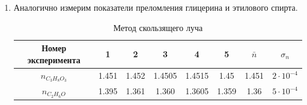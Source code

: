 \documentclass[12pt]{article}
\begin{document}
\begin{enumerate}
    \item Аналогично измерим показатели преломления глицерина и этилового спирта.
    
    \begin{table}[h!]
        \centering
        \begin{tabular}{| c | c | c | c | c | c | c | c |} 
            \hline
            Номер эксперимента & 1 & 2 & 3 & 4 & 5 & $\bar{n}$ & $\sigma_n$ \\
            \hline
            $n_{C_3 H_8 O_3}$ & 1.451 & 1.452 & 1.4505 & 1.4515 & 1.45 & 1.451 & $2 \cdot 10^{-4}$ \\ 
            \hline
            $n_{C_2 H_6 O}$ & 1.395 & 1.361 & 1.360 & 1.3605 & 1.359 & 1.36 & $5 \cdot 10^{-4}$ \\
            \hline
        \end{tabular}
        \caption{Метод скользящего луча}
    \end{table}   
    

\end{enumerate}
\end{document}
